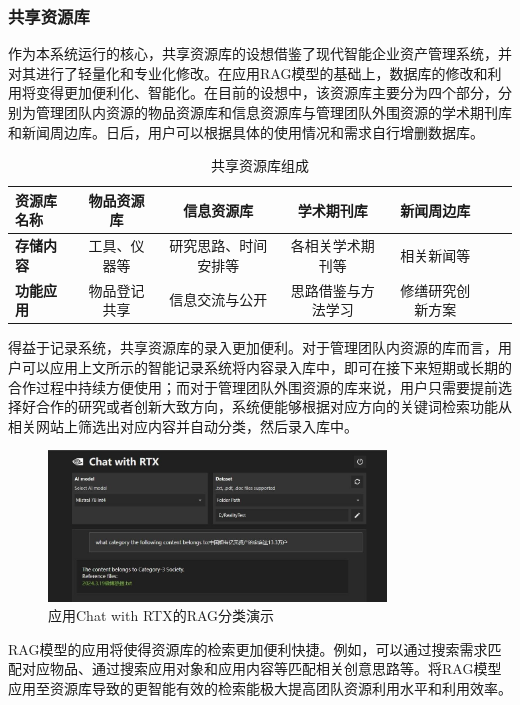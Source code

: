 \documentclass[zihao=-4]{ctexart}
\begin{document}
\begin{spacing}{1.5}
 \subsubsection{共享资源库 }
作为本系统运行的核心，共享资源库的设想借鉴了现代智能企业资产管理系统，并对其进行了轻量化和专业化修改。在应用RAG模型的基础上，数据库的修改和利用将变得更加便利化、智能化。在目前的设想中，该资源库主要分为四个部分，分别为管理团队内资源的物品资源库和信息资源库与管理团队外围资源的学术期刊库和新闻周边库。日后，用户可以根据具体的使用情况和需求自行增删数据库。
\begin{table}[H]
\small
\centering
\caption{共享资源库组成}
\begin{tabular}{|l||c|c|c|c|c|c|}
\hline
{\textbf{资源库名称}}     & \textbf{物品资源库} 	    &\textbf{信息资源库} 	  &\textbf{学术期刊库}     &\textbf{新闻周边库} 		\\ \hline
{\textbf{存储内容}} 		& 工具、仪器等			&研究思路、时间安排等		&各相关学术期刊等 	 &相关新闻等		\\ \hline
{\textbf{功能应用}}              &物品登记共享				&信息交流与公开		&思路借鉴与方法学习	   &修缮研究创新方案		\\ \hline
\end{tabular}
\end{table}
得益于记录系统，共享资源库的录入更加便利。对于管理团队内资源的库而言，用户可以应用上文所示的智能记录系统将内容录入库中，即可在接下来短期或长期的合作过程中持续方便使用；而对于管理团队外围资源的库来说，用户只需要提前选择好合作的研究或者创新大致方向，系统便能够根据对应方向的关键词检索功能从相关网站上筛选出对应内容并自动分类，然后录入库中。
\begin{figure}[H] %
    \centering %
    \includegraphics[width=0.8\textwidth]{自动分类示例.jpg} %
    \caption{应用Chat with RTX的RAG分类演示} %
    \label{example_label} %
\end{figure}
RAG模型的应用将使得资源库的检索更加便利快捷。例如，可以通过搜索需求匹配对应物品、通过搜索应用对象和应用内容等匹配相关创意思路等。将RAG模型应用至资源库导致的更智能有效的检索能极大提高团队资源利用水平和利用效率。

\end{spacing}
\end{document}
